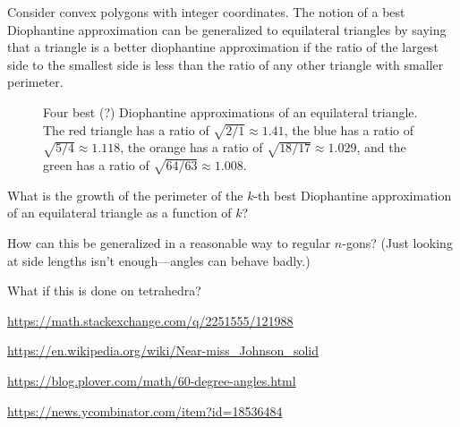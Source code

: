 \documentclass{article}
\begin{document}
Consider convex polygons with integer coordinates. The notion of a best
Diophantine approximation can be generalized to equilateral triangles by
saying that a triangle is a better diophantine approximation if
the ratio of the largest side to the smallest side is less than the ratio of
any other triangle with smaller perimeter.
\begin{figure}[ht!]
  \centering
  \caption{
    Four best (?) Diophantine approximations of an equilateral triangle.
    The red triangle has a ratio of $\sqrt{2/1} \approx 1.41$,
    the blue has a ratio of $\sqrt{5/4} \approx 1.118$,
    the orange has a ratio of $\sqrt{18/17} \approx 1.029$, and
    the green has a ratio of $\sqrt{64/63} \approx 1.008$.
  }
\end{figure}
\begin{question}
  What is the growth of the perimeter of the $k$-th best Diophantine
  approximation of an equilateral triangle as a function of $k$?
\end{question}

\begin{related}
  \item How can this be generalized in a reasonable way to regular $n$-gons?
    (Just looking at side lengths isn't enough---angles can behave badly.)
  \item What if this is done on tetrahedra?
\end{related}
\begin{references}
  \item \url{https://math.stackexchange.com/q/2251555/121988}
  \item \url{https://en.wikipedia.org/wiki/Near-miss_Johnson_solid}
  \item \url{https://blog.plover.com/math/60-degree-angles.html}
  \item \url{https://news.ycombinator.com/item?id=18536484}
\end{references}
\end{document}
